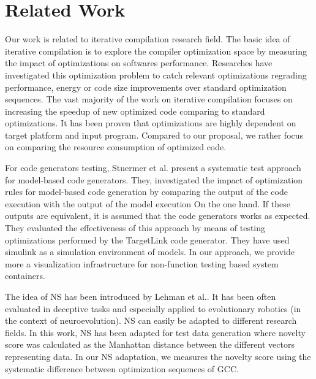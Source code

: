 \section{Related Work}
Our work is related to iterative compilation research field.
The basic idea of iterative compilation is to explore
the compiler optimization space by measuring the impact of optimizations on softwares performance.
Researches have investigated this optimization problem to catch relevant optimizations regrading performance, energy or code size improvements over standard optimization sequences\cite{almagor2004finding,hoste2008cole,jantz2013performance,pan2006fast,zhong2009tuning,pallister2015identifying,chen2012deconstructing,sandran2012genetic,martins2014exploration,fursin2008milepost,lin2008automatic,schulte2014post}. The vast majority of the work on iterative compilation focuses on increasing the speedup of new optimized code comparing to standard optimizations. It has been proven that optimizations are highly dependent on target platform and input program. Compared to our proposal, we rather focus on comparing the resource consumption of optimized code.

For code generators testing, Stuermer et al.\cite{stuermer2007systematic} present a systematic test
approach for model-based code generators. They, investigated  the impact of optimization rules for model-based code generation by comparing the output of the code execution with the output of the model execution On the one hand. If these outputs are equivalent, it is assumed that the code generators works as expected. They evaluated the effectiveness of this approach by means of testing optimizations performed by the TargetLink code generator. They have used simulink as a simulation environment of models. In our approach, we provide more a visualization infrastructure for non-function testing based system containers.

The idea of NS has been introduced by Lehman et al.\cite{lehman2008exploiting}. It has been often evaluated in deceptive tasks and especially applied to evolutionary robotics (in the context of neuroevolution)\cite{risi2010evolving,krvcah2012solving}. NS can easily be adapted to different research fields. In this work\cite{boussaa2015novelty}, NS has been adapted for test data generation where novelty score was calculated as the Manhattan distance between the different vectors representing data. In our NS adaptation, we measures the novelty score using the systematic difference between optimization sequences of GCC.